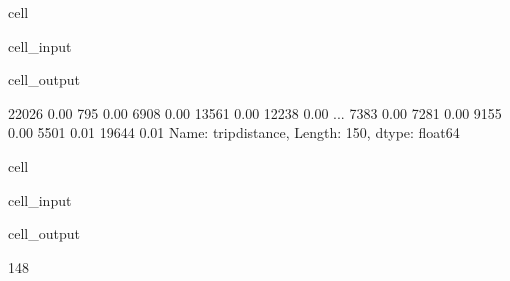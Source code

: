 \documentclass[letterpaper,10pt,english]{sphinxmanual}
\begin{document}
\begin{sphinxuseclass}{cell}
\begin{sphinxuseclass}{cell_input}
\begin{sphinxVerbatim}[commandchars=\\\{\}]
\PYG{p}{[}\PYG{p}{]}\PYG{p}{[}\PYG{p}{]}
\end{sphinxVerbatim}

\end{sphinxuseclass}
\begin{sphinxuseclass}{cell_output}
\begin{sphinxVerbatim}[commandchars=\\\{\}]
22026    0.00
795      0.00
6908     0.00
13561    0.00
12238    0.00
         ... 
7383     0.00
7281     0.00
9155     0.00
5501     0.01
19644    0.01
Name: trip\PYGZus{}distance, Length: 150, dtype: float64
\end{sphinxVerbatim}

\end{sphinxuseclass}
\end{sphinxuseclass}
\begin{sphinxuseclass}{cell}
\begin{sphinxuseclass}{cell_input}
\begin{sphinxVerbatim}[commandchars=\\\{\}]
\PYG{p}{[}\PYG{p}{]}  
\end{sphinxVerbatim}

\end{sphinxuseclass}
\begin{sphinxuseclass}{cell_output}
\begin{sphinxVerbatim}[commandchars=\\\{\}]
148
\end{sphinxVerbatim}

\end{sphinxuseclass}
\end{sphinxuseclass}
\end{document}
